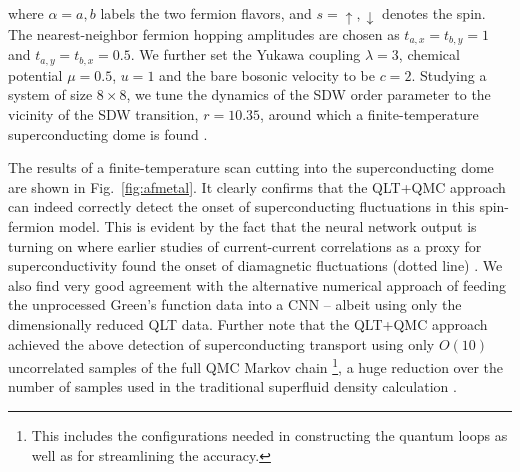 \documentclass[amsmath,amssymb, aps, prx, longbibliography, twocolumn]{revtex4-1}
\begin{document}
where $\alpha=a,b$ labels the two fermion flavors, and $s = \uparrow, \downarrow$ denotes the spin. The nearest-neighbor fermion hopping amplitudes are chosen as $t_{a,x}=t_{b,y}=1$ and $t_{a,y}=t_{b,x}=0.5$. We further set the Yukawa coupling $\lambda=3$, chemical potential $\mu=0.5$, $u=1$ and the bare bosonic velocity to be $c=2$.
Studying a system of size $8\times 8$, we tune the dynamics of the SDW order parameter to the vicinity of the SDW transition, $r=10.35$, around which a finite-temperature superconducting dome is found \cite{Schattner2016}.






The results of a finite-temperature scan cutting into the superconducting dome are shown in Fig.~\ref{fig:afmetal}. It clearly confirms that the QLT+QMC approach can indeed correctly detect the onset of superconducting fluctuations in this spin-fermion model. This is evident by the fact that the neural network output is turning on where earlier studies of current-current correlations \cite{Schattner2016,Lederer2017} as a proxy for superconductivity found the onset of diamagnetic fluctuations (dotted line) \cite{Schattner2016}. 
We also find very good agreement with the alternative numerical approach of feeding the unprocessed Green's function data into a CNN -- albeit using only the dimensionally reduced QLT data.
Further note that the QLT+QMC approach achieved the above detection of superconducting transport using only $O(10)$ uncorrelated samples of the full QMC Markov chain \footnote{This includes the configurations needed in constructing the quantum loops as well as for streamlining the accuracy.}, a huge reduction over the number of samples used in the traditional superfluid density calculation \cite{Hong2016, Schattner2016}. 



\end{document}

